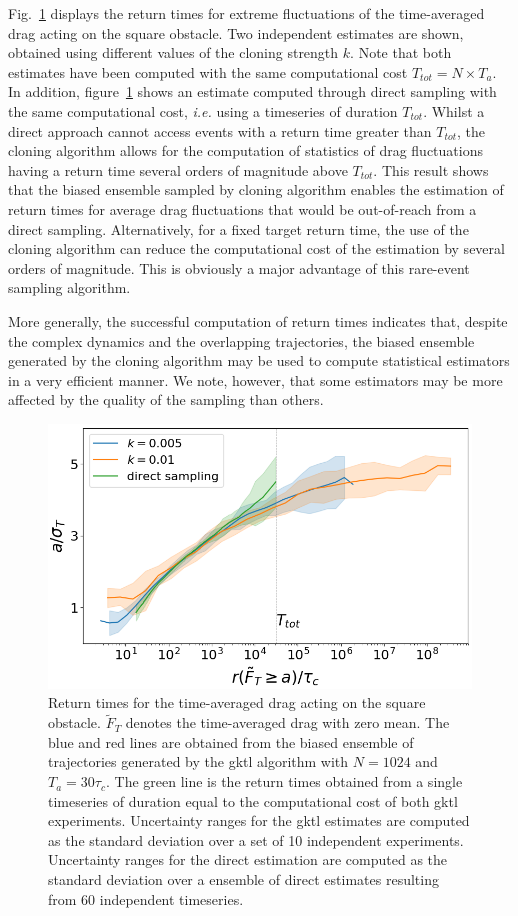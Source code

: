 \documentclass{jfm}
\begin{document}
Fig.~\ref{fig:return_times_gktl} displays the return times for extreme fluctuations of the time-averaged drag acting on the square obstacle.
Two independent estimates are shown, obtained using different values of the cloning strength $k$.
Note that both estimates have been computed with the same computational cost $T_{tot}=N\times T_a$.
In addition, figure~\ref{fig:return_times_gktl} shows an estimate computed through direct sampling with the same computational cost, \textit{i.e.} using a timeseries of duration $T_{tot}$.
Whilst a direct approach cannot access events with a return time greater than $T_{tot}$, the cloning algorithm allows for the computation of statistics of drag fluctuations having a return time several orders of magnitude above $T_{tot}$.
This result shows that the biased ensemble sampled by cloning algorithm enables the estimation of return times for average drag fluctuations that would be out-of-reach from a direct sampling.
Alternatively, for a fixed target return time, the use of the cloning algorithm can reduce the computational cost of the estimation by several orders of magnitude.
This is obviously a major advantage of this rare-event sampling algorithm.

More generally, the successful computation of return times indicates that, despite the complex dynamics and the overlapping trajectories, the biased ensemble generated by the cloning algorithm may be used to compute statistical estimators in a very efficient manner.
We note, however, that some estimators may be more affected by the quality of the sampling than others.

\begin{figure}
	\centering
	\includegraphics[width=.7\linewidth]{return_times_GKTL/return_times_GKTL}
	\caption{\label{fig:return_times_gktl} Return times for the time-averaged drag acting on the square obstacle. $\tilde{F}_T$ denotes the time-averaged drag with zero mean. The blue and red lines are obtained from the biased ensemble of trajectories generated by the \ac{gktl} algorithm with $N=1024$ and $T_a=30\tau_c$. The green line is the return times obtained from a single timeseries of duration equal to the computational cost of both \ac{gktl} experiments. Uncertainty ranges for the \ac{gktl} estimates are computed as the standard deviation over a set of 10 independent experiments. Uncertainty ranges for the direct estimation are computed as the standard deviation over a ensemble of direct estimates resulting from 60 independent timeseries.}
\end{figure}
\end{document}
